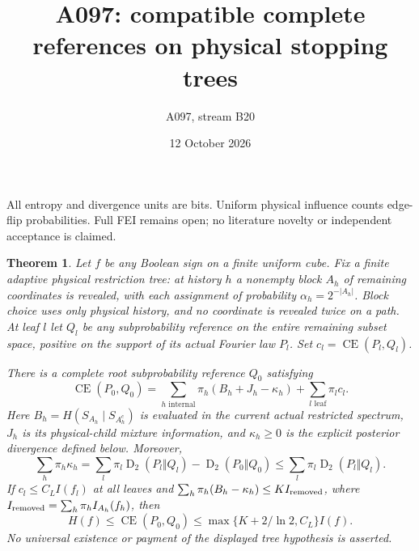 \documentclass[11pt]{article}
\newtheorem{theorem}{Theorem}
\newcommand{\CE}{\operatorname{CE}}
\newcommand{\KL}{\operatorname{D}_2}
\begin{document}
\title{A097: compatible complete references on physical stopping trees}
\author{A097, stream B20}
\date{12 October 2026}
\maketitle
All entropy and divergence units are bits. Uniform physical influence counts
edge-flip probabilities. Full FEI remains open; no literature novelty or
independent acceptance is claimed.

\begin{theorem}
Let $f$ be any Boolean sign on a finite uniform cube. Fix a finite adaptive
physical restriction tree: at history $h$ a nonempty block $A_h$ of remaining
coordinates is revealed, with each assignment of probability
$\alpha_h=2^{-|A_h|}$. Block choice uses only physical history, and no coordinate
is revealed twice on a path. At leaf $l$ let $Q_l$ be any subprobability
reference on the entire remaining subset space, positive on the support
of its actual Fourier law $P_l$. Set $c_l=\CE(P_l,Q_l)$.

There is a complete root subprobability reference $Q_0$ satisfying
\[
 \CE(P_0,Q_0)=\sum_{h\text{ internal}}\pi_h(B_h+J_h-\kappa_h)
                       +\sum_{l\text{ leaf}}\pi_l c_l.
\]
Here $B_h=H(S_{A_h}\mid S_{A_h^c})$ is evaluated in the current actual
restricted spectrum, $J_h$ is its physical-child mixture information, and
$\kappa_h\ge0$ is the explicit posterior divergence defined below. Moreover,
\[
 \sum_h\pi_h\kappa_h
 =\sum_l\pi_l\KL(P_l\Vert Q_l)-\KL(P_0\Vert Q_0)
 \le\sum_l\pi_l\KL(P_l\Vert Q_l).
\]
If $c_l\le C_L I(f_l)$ at all leaves and
$\sum_h\pi_h(B_h-\kappa_h)\le K I_{\rm removed}$, where
$I_{\rm removed}=\sum_h\pi_h I_{A_h}(f_h)$, then
\[
 H(f)\le\CE(P_0,Q_0)\le\max\{K+2/\ln2,C_L\}I(f).
\]
No universal existence or payment of the displayed tree hypothesis is asserted.
\end{theorem}
\end{document}
